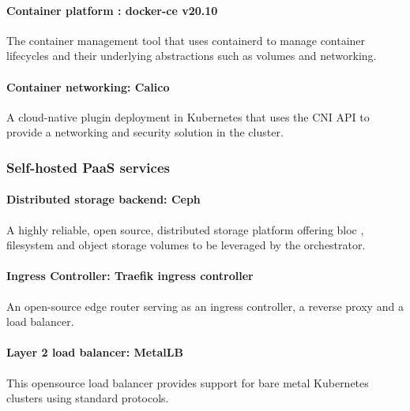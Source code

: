 \paragraph{Container platform : docker-ce v20.10 }

\hspace{7mm}The container management tool that uses containerd to manage container lifecycles and their underlying abstractions such as volumes and networking.  

\paragraph{Container networking: Calico }

\hspace{7mm}A cloud-native plugin deployment in Kubernetes that uses the CNI API to provide a networking and security solution in the cluster. 

\subsubsection{Self-hosted PaaS services }

\paragraph{Distributed storage backend: Ceph\cite{Ceph} }

\hspace{7mm}A highly reliable, open source, distributed storage platform offering bloc , filesystem and object storage volumes to be leveraged by the orchestrator. 

\paragraph{Ingress Controller: Traefik ingress controller }

\hspace{7mm}An open-source edge router serving as an ingress controller, a reverse proxy and a load balancer. 

\paragraph{Layer 2 load balancer: MetalLB}

\hspace{7mm}This opensource load balancer provides support for bare metal Kubernetes clusters using standard protocols. 

